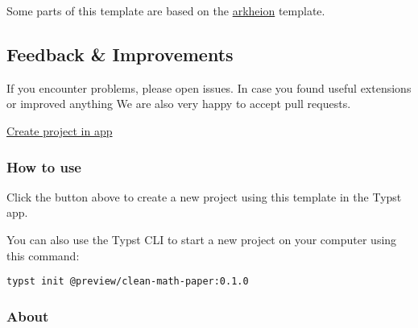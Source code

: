 Some parts of this template are based on the
\href{https://github.com/mgoulao/arkheion}{arkheion} template.

\subsection{Feedback \& Improvements}\label{feedback-improvements}

If you encounter problems, please open issues. In case you found useful
extensions or improved anything We are also very happy to accept pull
requests.

\href{/app?template=clean-math-paper&version=0.1.0}{Create project in
app}

\subsubsection{How to use}\label{how-to-use}

Click the button above to create a new project using this template in
the Typst app.

You can also use the Typst CLI to start a new project on your computer
using this command:

\begin{verbatim}
typst init @preview/clean-math-paper:0.1.0
\end{verbatim}



\subsubsection{About}\label{about}

